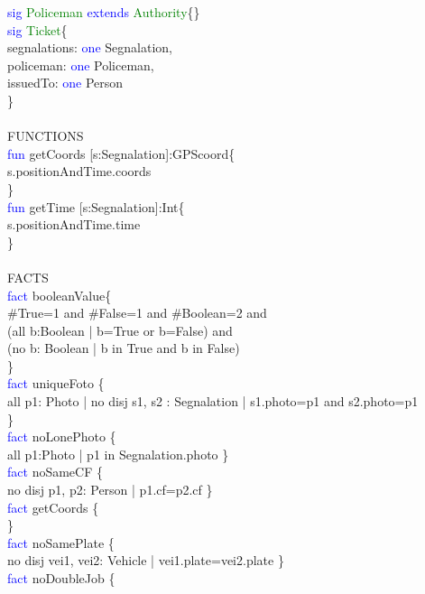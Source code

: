 \textcolor{blue}{sig}
\textcolor{green}{Policeman}
\textcolor{blue}{extends}
\textcolor{green}{Authority}\{\}\\
\textcolor{blue}{sig}
\textcolor{green}{Ticket}\{ \\
segnalations: \textcolor{blue}{one} Segnalation,\\
policeman: \textcolor{blue}{one} Policeman,\\
issuedTo: \textcolor{blue}{one} Person\\
\}\\
\\
FUNCTIONS\\
\textcolor{blue}{fun}
\textcolor{mycolor}{getCoords} [s:Segnalation]:GPScoord\{\\
s.positionAndTime.coords\\
\}\\
\textcolor{blue}{fun}
\textcolor{mycolor}{getTime} [s:Segnalation]:Int\{\\
s.positionAndTime.time\\
\}\\
\\
FACTS\\
\textcolor{blue}{fact}
\textcolor{mycolor}{booleanValue}\{\\
\#True=1 and \#False=1 and \#Boolean=2 and \\
(all b:Boolean | b=True or b=False) and\\
(no b: Boolean | b in True and b in False)\\
\}\\
\textcolor{blue}{fact}
\textcolor{mycolor}{uniqueFoto} \{\\
all p1: Photo | no disj s1, s2 : Segnalation | s1.photo=p1 and s2.photo=p1\\
\}\\
\textcolor{blue}{fact}
\textcolor{mycolor}{noLonePhoto} \{\\
all p1:Photo | p1 in Segnalation.photo
\}\\
\textcolor{blue}{fact}
\textcolor{mycolor}{noSameCF} \{\\
no disj p1, p2: Person | p1.cf=p2.cf
\}\\
\textcolor{blue}{fact}
\textcolor{mycolor}{getCoords} \{\\
\}\\
\textcolor{blue}{fact}
\textcolor{mycolor}{noSamePlate} \{\\
no disj vei1, vei2: Vehicle | vei1.plate=vei2.plate
\}\\
\textcolor{blue}{fact}
\textcolor{mycolor}{noDoubleJob} \{\\
